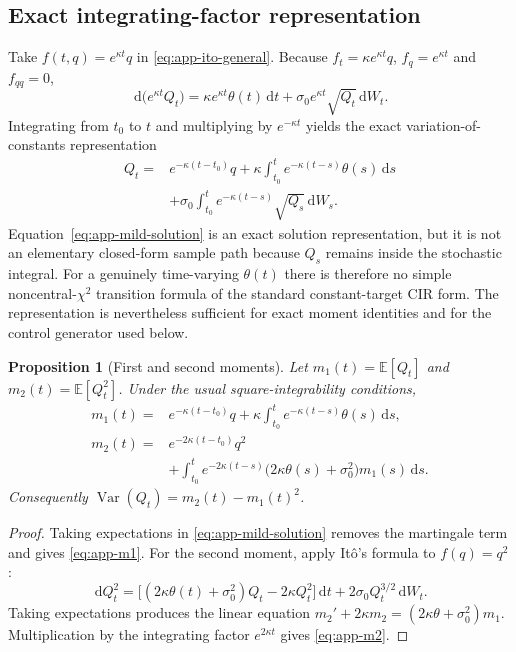 \documentclass[11pt,a4paper]{article}
\newcommand{\E}{\mathbb{E}}
\newcommand{\dif}{\,\mathrm{d}}
\newtheorem{proposition}{Proposition}
\begin{document}
\subsection{Exact integrating-factor representation}
Take $f(t,q)=e^{\kappa t}q$ in \eqref{eq:app-ito-general}. Because
$f_t=\kappa e^{\kappa t}q$, $f_q=e^{\kappa t}$ and $f_{qq}=0$,
\begin{equation}
 \dif\big(e^{\kappa t}Q_t\big)
 =\kappa e^{\kappa t}\theta(t)\dif t
 +\sigma_0e^{\kappa t}\sqrt{Q_t}\dif W_t.
 \label{eq:app-integrating-factor}
\end{equation}
Integrating from $t_0$ to $t$ and multiplying by $e^{-\kappa t}$ yields the exact
variation-of-constants representation
\begin{align}
 Q_t={}&e^{-\kappa(t-t_0)}q
 +\kappa\int_{t_0}^{t}e^{-\kappa(t-s)}\theta(s)\dif s \\
 &+\sigma_0\int_{t_0}^{t}e^{-\kappa(t-s)}\sqrt{Q_s}\dif W_s.
 \label{eq:app-mild-solution}
\end{align}
Equation~\eqref{eq:app-mild-solution} is an exact solution representation, but it
is not an elementary closed-form sample path because $Q_s$ remains inside the
stochastic integral. For a genuinely time-varying $\theta(t)$ there is therefore
no simple noncentral-$\chi^2$ transition formula of the standard constant-target
CIR form. The representation is nevertheless sufficient for exact moment identities
and for the control generator used below.

\begin{proposition}[First and second moments]\label{prop:app-moments}
Let $m_1(t)=\E[Q_t]$ and $m_2(t)=\E[Q_t^2]$. Under the usual square-integrability
conditions,
\begin{align}
 m_1(t)={}&e^{-\kappa(t-t_0)}q
 +\kappa\int_{t_0}^{t}e^{-\kappa(t-s)}\theta(s)\dif s,
 \label{eq:app-m1}\\
 m_2(t)={}&e^{-2\kappa(t-t_0)}q^2 \\
 &+\int_{t_0}^{t}e^{-2\kappa(t-s)}
 \big(2\kappa\theta(s)+\sigma_0^2\big)m_1(s)\dif s.
 \label{eq:app-m2}
\end{align}
Consequently $\operatorname{Var}(Q_t)=m_2(t)-m_1(t)^2$.
\end{proposition}

\begin{proof}
Taking expectations in \eqref{eq:app-mild-solution} removes the martingale term and
gives \eqref{eq:app-m1}. For the second moment, apply It\^o's formula to
$f(q)=q^2$:
\begin{equation}
 \dif Q_t^2=\Big[(2\kappa\theta(t)+\sigma_0^2)Q_t
 -2\kappa Q_t^2\Big]\dif t
 +2\sigma_0Q_t^{3/2}\dif W_t.
 \label{eq:app-q2}
\end{equation}
Taking expectations produces the linear equation
$m_2'+2\kappa m_2=(2\kappa\theta+\sigma_0^2)m_1$. Multiplication by the
integrating factor $e^{2\kappa t}$ gives \eqref{eq:app-m2}.
\end{proof}
\end{document}
